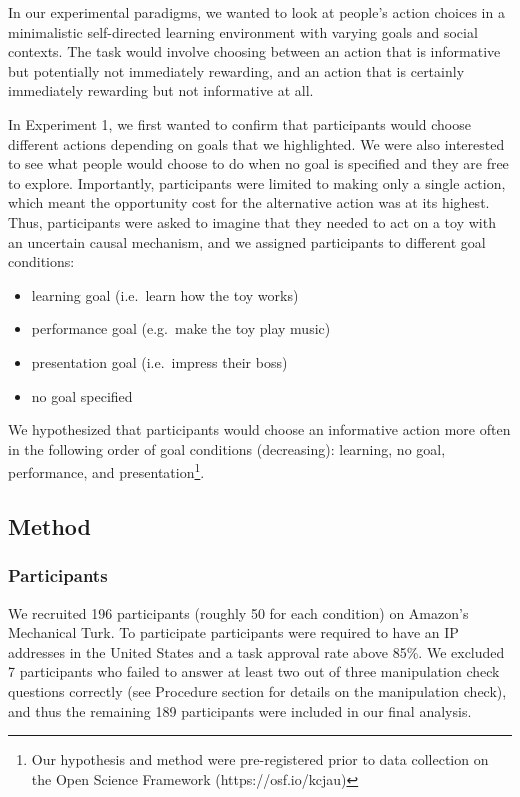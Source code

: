 \documentclass[10pt, letterpaper]{article}
\begin{document}
In our experimental paradigms, we wanted to look at people's action
choices in a minimalistic self-directed learning environment with
varying goals and social contexts. The task would involve choosing
between an action that is informative but potentially not immediately
rewarding, and an action that is certainly immediately rewarding but not
informative at all.

In Experiment 1, we first wanted to confirm that participants would
choose different actions depending on goals that we highlighted. We were
also interested to see what people would choose to do when no goal is
specified and they are free to explore. Importantly, participants were
limited to making only a single action, which meant the opportunity cost
for the alternative action was at its highest. Thus, participants were
asked to imagine that they needed to act on a toy with an uncertain
causal mechanism, and we assigned participants to different goal
conditions:

\begin{itemize}
\item
  learning goal (i.e.~learn how the toy works)
\item
  performance goal (e.g.~make the toy play music)
\item
  presentation goal (i.e.~impress their boss)
\item
  no goal specified
\end{itemize}

\noindent
We hypothesized that participants would choose an informative action
more often in the following order of goal conditions (decreasing):
learning, no goal, performance, and
presentation\footnote{Our hypothesis and method were pre-registered prior to data collection on the Open Science Framework (https://osf.io/kcjau)}.

\subsection{Method}\label{method}

\subsubsection{Participants}\label{participants}

We recruited 196 participants (roughly 50 for each condition) on
Amazon's Mechanical Turk. To participate participants were required to
have an IP addresses in the United States and a task approval rate above
85\%. We excluded 7 participants who failed to answer at least two out
of three manipulation check questions correctly (see Procedure section
for details on the manipulation check), and thus the remaining 189
participants were included in our final analysis.
\end{document}
